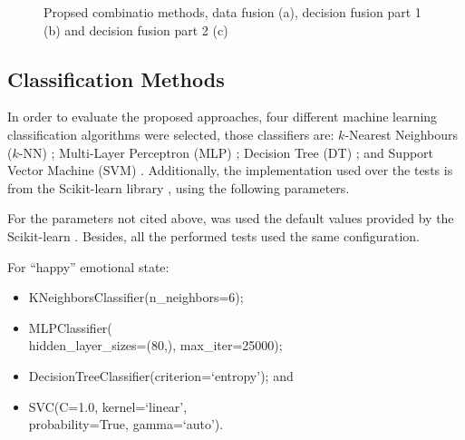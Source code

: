 \documentclass[conference]{IEEEtran}
\begin{document}
\begin{figure}
    \caption{Propsed combinatio methods, data fusion (a), decision fusion part 1 (b) and decision fusion part 2 (c)}%
    \label{fig:combination}%
\end{figure}



\subsection{Classification Methods}

In order to evaluate the proposed approaches, four different machine learning classification algorithms were selected, those classifiers are: $k$-Nearest Neighbours ($k$-NN) \cite{knn}; Multi-Layer Perceptron (MLP) \cite{mlp}; Decision Tree (DT) \cite{dt}; and Support Vector Machine (SVM) \cite{svm}. Additionally, the implementation used over the tests is from the Scikit-learn library \cite{sklearn}, using the following parameters.

For the parameters not cited above, was used the default values provided by the Scikit-learn \cite{sklearn}. Besides, all the performed tests used the same configuration.

For ``happy'' emotional state:

\begin{itemize}
    \item KNeighborsClassifier(n\_neighbors=6);
    \item MLPClassifier(\\hidden\_layer\_sizes=(80,), max\_iter=25000);
    \item DecisionTreeClassifier(criterion=`entropy'); and
    \item SVC(C=1.0, kernel=`linear', \\probability=True, gamma=`auto').
\end{itemize}
\end{document}
